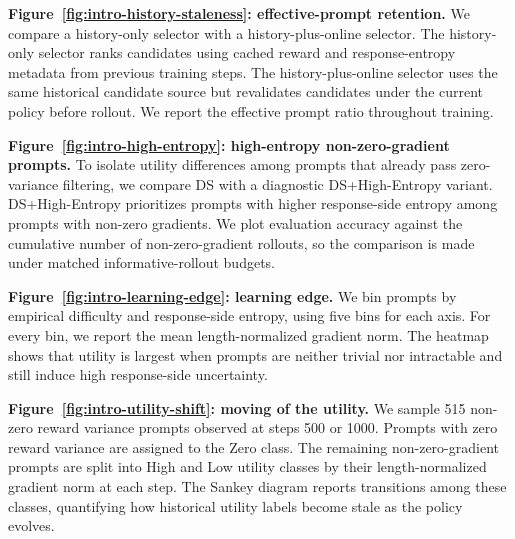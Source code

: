 \textbf{Figure~\ref{fig:intro-history-staleness}: effective-prompt retention.}
We compare a history-only selector with a history-plus-online selector. The history-only selector ranks candidates using cached reward and response-entropy metadata from previous training steps. The history-plus-online selector uses the same historical candidate source but revalidates candidates under the current policy before rollout. We report the effective prompt ratio throughout training.

\textbf{Figure~\ref{fig:intro-high-entropy}: high-entropy non-zero-gradient prompts.}
To isolate utility differences among prompts that already pass zero-variance filtering, we compare DS with a diagnostic DS+High-Entropy variant. DS+High-Entropy prioritizes prompts with higher response-side entropy among prompts with non-zero gradients. We plot evaluation accuracy against the cumulative number of non-zero-gradient rollouts, so the comparison is made under matched informative-rollout budgets.

\textbf{Figure~\ref{fig:intro-learning-edge}: learning edge.}
We bin prompts by empirical difficulty and response-side entropy, using five bins for each axis. For every bin, we report the mean length-normalized gradient norm. The heatmap shows that utility is largest when prompts are neither trivial nor intractable and still induce high response-side uncertainty.

\textbf{Figure~\ref{fig:intro-utility-shift}: moving of the utility.}
We sample 515 non-zero reward variance prompts observed at steps 500 or 1000. Prompts with zero reward variance are assigned to the Zero class. The remaining non-zero-gradient prompts are split into High and Low utility classes by their length-normalized gradient norm at each step. The Sankey diagram reports transitions among these classes, quantifying how historical utility labels become stale as the policy evolves.